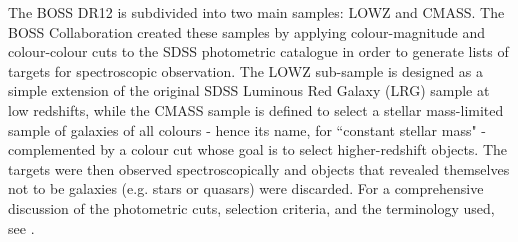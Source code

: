 \qquad The BOSS DR12 is subdivided into two main samples: LOWZ and CMASS. The BOSS Collaboration created these samples by applying colour-magnitude and colour-colour cuts to the SDSS photometric catalogue in order to generate lists of targets for spectroscopic observation. The LOWZ sub-sample is designed as a simple extension of the original SDSS Luminous Red Galaxy (LRG) sample \citep{2001Eisenstein} at low redshifts, while the CMASS  sample is defined to select a stellar mass-limited sample of galaxies of all colours - hence its name, for ``constant stellar mass" - complemented by a colour cut whose goal is to select higher-redshift objects. The targets were then observed spectroscopically and objects that revealed themselves not to be galaxies (e.g. stars or quasars) were discarded. For a comprehensive discussion of the photometric cuts, selection criteria, and the terminology used, see \cite{BOSS}.

